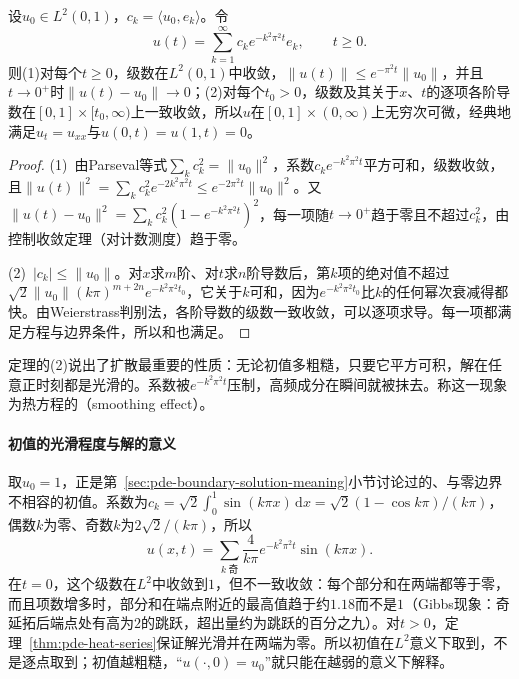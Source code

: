 \begin{theorem}[区间上热方程的级数解]
\label{thm:pde-heat-series}
设$u_0\in L^2(0,1)$，$c_k=\langle u_0,e_k\rangle$。令
\begin{equation}
  u(t)=\sum_{k=1}^\infty c_ke^{-k^2\pi^2t}e_k,\qquad t\geq0 .
  \label{eq:pde-heat-series}
\end{equation}
则(1)对每个$t\geq0$，级数在$L^2(0,1)$中收敛，$\|u(t)\|\leq e^{-\pi^2t}\|u_0\|$，并且$t\to0^+$时$\|u(t)-u_0\|\to0$；(2)对每个$t_0>0$，级数及其关于$x$、$t$的逐项各阶导数在$[0,1]\times[t_0,\infty)$上一致收敛，所以$u$在$[0,1]\times(0,\infty)$上无穷次可微，经典地满足$u_t=u_{xx}$与$u(0,t)=u(1,t)=0$。
\end{theorem}

\begin{proof}
(1)~由Parseval等式$\sum_kc_k^2=\|u_0\|^2$，系数$c_ke^{-k^2\pi^2t}$平方可和，级数收敛，且$\|u(t)\|^2=\sum_kc_k^2e^{-2k^2\pi^2t}\leq e^{-2\pi^2t}\|u_0\|^2$。又$\|u(t)-u_0\|^2=\sum_kc_k^2(1-e^{-k^2\pi^2t})^2$，每一项随$t\to0^+$趋于零且不超过$c_k^2$，由控制收敛定理（对计数测度）趋于零。

(2)~$|c_k|\leq\|u_0\|$。对$x$求$m$阶、对$t$求$n$阶导数后，第$k$项的绝对值不超过$\sqrt2\|u_0\|(k\pi)^{m+2n}e^{-k^2\pi^2t_0}$，它关于$k$可和，因为$e^{-k^2\pi^2t_0}$比$k$的任何幂次衰减得都快。由Weierstrass判别法，各阶导数的级数一致收敛，可以逐项求导。每一项都满足方程与边界条件，所以和也满足。
\end{proof}

定理的(2)说出了扩散最重要的性质：无论初值多粗糙，只要它平方可积，解在任意正时刻都是光滑的。系数被$e^{-k^2\pi^2t}$压制，高频成分在瞬间就被抹去。称这一现象为热方程的（smoothing effect）。

\paragraph{初值的光滑程度与解的意义}
取$u_0=1$，正是第~\ref{sec:pde-boundary-solution-meaning}小节讨论过的、与零边界不相容的初值。系数为$c_k=\sqrt2\int_0^1\sin(k\pi x)\,\mathrm dx=\sqrt2(1-\cos k\pi)/(k\pi)$，偶数$k$为零、奇数$k$为$2\sqrt2/(k\pi)$，所以
\[
  u(x,t)=\sum_{k\ \text{奇}}\frac{4}{k\pi}e^{-k^2\pi^2t}\sin(k\pi x).
\]
在$t=0$，这个级数在$L^2$中收敛到$1$，但不一致收敛：每个部分和在两端都等于零，而且项数增多时，部分和在端点附近的最高值趋于约$1.18$而不是$1$（Gibbs现象：奇延拓后端点处有高为$2$的跳跃，超出量约为跳跃的百分之九）。对$t>0$，定理~\ref{thm:pde-heat-series}保证解光滑并在两端为零。所以初值在$L^2$意义下取到，不是逐点取到；初值越粗糙，“$u(\cdot,0)=u_0$”就只能在越弱的意义下解释。

